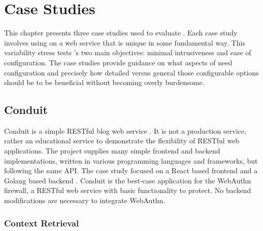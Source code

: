 
\chapter{Case Studies}\label{Chap:CaseStudies}

This chapter presents three case studies used to evaluate \sys{}. Each case study involves using \sys{} on a web service that is unique in some fundamental way. This variability stress tests \sys{}'s two main objectives: minimal intrusiveness and ease of configuration. The case studies provide guidance on what aspects of \sys{} need configuration and precisely how detailed versus general those configurable options should be to be beneficial without becoming overly burdensome.

\section{Conduit}

Conduit is a simple RESTful blog web service \cite{conduit}. It is not a production service, rather an educational service to demonstrate the flexibility of RESTful web applications. The project supplies many simple frontend and backend implementations, written in various programming languages and frameworks, but following the same API. The case study focused on a React based frontend \cite{conduit-frontend} and a Golang based backend \cite{conduit-backend}. Conduit is the best-case application for the WebAuthn firewall, a RESTful web service with basic functionality to protect. No backend modifications are necessary to integrate WebAuthn.



\subsection{Context Retrieval}\label{Sec:Conduit_ContextRetrieval}

